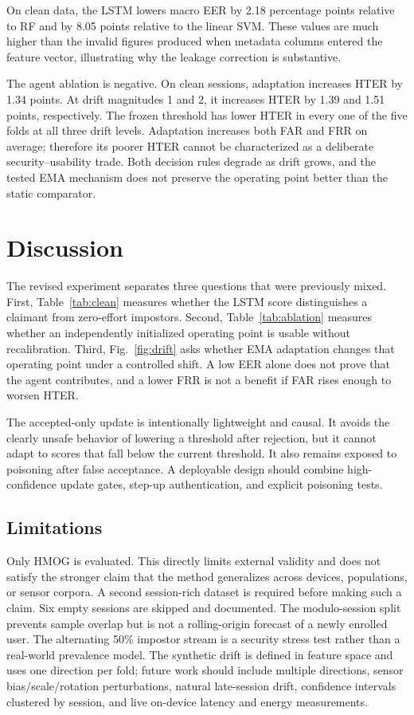 \documentclass[3p,times,procedia]{elsarticle}
\begin{document}
On clean data, the LSTM lowers macro EER by 2.18 percentage points relative to
RF and by 8.05 points relative to the linear SVM. These values are much higher
than the invalid figures produced when metadata columns entered the feature
vector, illustrating why the leakage correction is substantive.

The agent ablation is negative. On clean sessions, adaptation increases HTER by
1.34 points. At drift magnitudes 1 and 2, it increases HTER by 1.39 and 1.51
points, respectively. The frozen threshold has lower HTER in every one of the
five folds at all three drift levels. Adaptation increases both FAR and FRR on
average; therefore its poorer HTER cannot be characterized as a deliberate
security--usability trade. Both decision rules degrade as drift grows, and the
tested EMA mechanism does not preserve the operating point better than the
static comparator.

\section{Discussion}
\label{sec:discussion}

The revised experiment separates three questions that were previously mixed.
First, Table~\ref{tab:clean} measures whether the LSTM score distinguishes a
claimant from zero-effort impostors. Second, Table~\ref{tab:ablation} measures
whether an independently initialized operating point is usable without
recalibration. Third, Fig.~\ref{fig:drift} asks whether EMA adaptation changes
that operating point under a controlled shift. A low EER alone does not prove
that the agent contributes, and a lower FRR is not a benefit if FAR rises enough
to worsen HTER.

The accepted-only update is intentionally lightweight and causal. It avoids the
clearly unsafe behavior of lowering a threshold after rejection, but it cannot
adapt to scores that fall below the current threshold. It also remains exposed
to poisoning after false acceptance. A deployable design should combine
high-confidence update gates, step-up authentication, and explicit poisoning
tests.

\subsection{Limitations}

Only HMOG is evaluated. This directly limits external validity and does not
satisfy the stronger claim that the method generalizes across devices,
populations, or sensor corpora. A second session-rich dataset is required before
making such a claim. Six empty sessions are skipped and documented. The
modulo-session split prevents sample overlap but is not a rolling-origin
forecast of a newly enrolled user. The alternating 50\% impostor stream is a
security stress test rather than a real-world prevalence model. The synthetic
drift is defined in feature space and uses one direction per fold; future work
should include multiple directions, sensor bias/scale/rotation perturbations,
natural late-session drift, confidence intervals clustered by session, and
live on-device latency and energy measurements.
\end{document}
